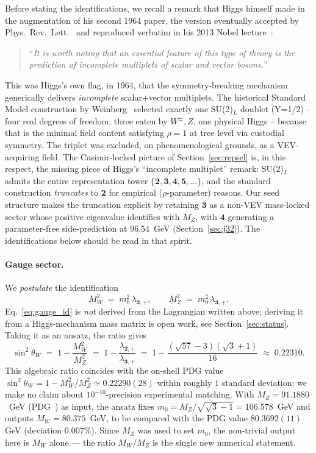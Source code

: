 \documentclass[11pt,a4paper]{article}
\newcommand{\md}{\mathbf{2}}
\newcommand{\mt}{\mathbf{3}}
\begin{document}
Before stating the identifications, we recall a remark that Higgs himself
made in the augmentation of his second 1964 paper, the version eventually
accepted by Phys.~Rev.~Lett.~\cite{Higgs1964} and reproduced verbatim in
his 2013 Nobel lecture~\cite{HiggsNobel2014}:

\begin{quote}
``\emph{It is worth noting that an essential feature of this type of theory is the prediction of incomplete multiplets of scalar and vector bosons.}''
\end{quote}

This was Higgs's own flag, in 1964, that the symmetry-breaking mechanism
generically delivers \emph{incomplete} scalar+vector multiplets. The
historical Standard Model construction by Weinberg~\cite{Weinberg1967}
selected exactly one SU(2)$_L$ doublet (Y=1/2) -- four real degrees of
freedom, three eaten by $W^\pm, Z$, one physical Higgs -- because that
is the minimal field content satisfying $\rho = 1$ at tree level via
custodial symmetry. The triplet was excluded, on phenomenological
grounds, as a VEV-acquiring field. The Casimir-locked picture of
Section~\ref{sec:repsel} is, in this respect, the missing piece of
Higgs's ``incomplete multiplet'' remark: SU(2)$_L$ admits the entire
representation tower $\{\md, \mt, \mathbf{4}, \mathbf{5}, \dots\}$, and
the standard construction \emph{truncates} to $\md$ for empirical
($\rho$-parameter) reasons. Our seed structure makes the truncation
explicit by retaining $\mt$ as a non-VEV mass-locked sector whose
positive eigenvalue identifies with $M_Z$, with $\mathbf{4}$ generating
a parameter-free side-prediction at $96.54$~GeV
(Section~\ref{sec:j32}). The identifications
below should be read in that spirit.

\paragraph{Gauge sector.} We \emph{postulate} the identification
\begin{equation}
  M_W^2 \;=\; m_0^2\, \lambda_{\md,+},
  \qquad
  M_Z^2 \;=\; m_0^2\, \lambda_{\mt,+}.
\label{eq:gauge_id}
\end{equation}
Eq.~\eqref{eq:gauge_id} is \emph{not} derived from the Lagrangian written
above; deriving it from a Higgs-mechanism mass matrix is open work, see
Section~\ref{sec:status}. Taking it as an ansatz, the ratio gives
\begin{equation}
  \sin^2\theta_W \;=\; 1 - \frac{M_W^2}{M_Z^2}
  \;=\; 1 - \frac{\lambda_{\md,+}}{\lambda_{\mt,+}}
  \;=\; 1 - \frac{(\sqrt{57}-3)(\sqrt{3}+1)}{16}
  \;\approx\; 0.22310.
\label{eq:sin2thW}
\end{equation}
This algebraic ratio coincides with the on-shell PDG value
$\sin^2\theta_W = 1 - M_W^2/M_Z^2 \simeq 0.22290(28)$ within roughly $1$
standard deviation; we make no claim about $10^{-10}$-precision
experimental matching. With $M_Z = 91.1880$~GeV
(PDG~\cite{PDG2024}) as input, the ansatz fixes
$m_0 = M_Z/\sqrt{\sqrt{3}-1} = 106.578$~GeV and outputs
$M_W = 80.375$~GeV, to be compared with the PDG value $80.3692(11)$ GeV
(deviation $0.007\%$). Since $M_Z$ was used to set $m_0$, the
non-trivial output here is $M_W$ alone --- the ratio $M_W/M_Z$ is the
single new numerical statement.
\end{document}
